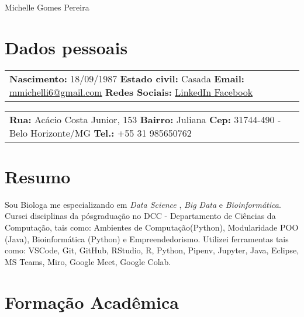 \documentclass[paper=a4,fontsize=11pt]{scrartcl} %
\newcommand{\MyName}[1]{ %
                \Huge \hfill #1
                \par \normalsize \normalfont}
\newcommand{\NewPart}[1]{\section*{{#1}}}
\begin{document}

\MyName{Michelle Gomes Pereira}



\NewPart{Dados pessoais}{}
\begin{minipage}{0.55\textwidth}
	\begin{tabular}{|p{\textwidth}}
		\textbf{Nascimento:} 18/09/1987 \newline
		\textbf{Estado civil:} Casada \newline
		\textbf{Email:} \href{mailto:mmichelli6@gmail.com}{mmichelli6@gmail.com} \newline
		\textbf{Redes Sociais:} \newline
		\href{https://www.linkedin.com/in/michellegomespereira/}{LinkedIn }
		\href{https://www.facebook.com/michelle.gomes.904}{ Facebook}
	\end{tabular}
\end{minipage}%
\begin{minipage}{0.45\textwidth}
	\begin{tabular}{|p{\textwidth}}
		\textbf{Rua:} Acácio Costa Junior, 153 \newline
		\textbf{Bairro:} Juliana \newline
		\textbf{Cep:} 31744-490 - Belo Horizonte/MG \newline
		\textbf{Tel.:} +55 31 985650762 \newline
	\end{tabular}
\end{minipage}%


\NewPart{Resumo}{}
Sou Biologa me especializando em \textit{Data Science} , \textit{Big Data} e \textit{Bioinformática}. Cursei disciplinas da 
pósgraduação no DCC - Departamento de Ciências da Computação, tais como: Ambientes de Computação(Python), Modularidade POO (Java), 
Bioinformática (Python) e Empreendedorismo. Utilizei ferramentas tais como: VSCode, Git, GitHub, RStudio, R, Python, Pipenv, Jupyter, Java, Eclipse, 
MS Teams, Miro, Google Meet, Google Colab.


\NewPart{Formação Acadêmica}{}
\end{document}
